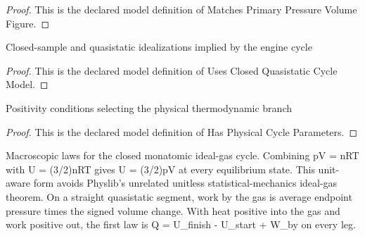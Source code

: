 \begin{proof}
  This is the declared model definition of Matches Primary Pressure Volume Figure.
\end{proof}
\begin{definition}
  \label{def:physics:phyx-mini-0433:phyxminiproblems-problemphyxmini0433-usesclosedquasistaticcyclemodel}
  Closed-sample and quasistatic idealizations implied by the engine cycle
\end{definition}
\begin{proof}
  This is the declared model definition of Uses Closed Quasistatic Cycle Model.
\end{proof}
\begin{definition}
  \label{def:physics:phyx-mini-0433:phyxminiproblems-problemphyxmini0433-hasphysicalcycleparameters}
  Positivity conditions selecting the physical thermodynamic branch
\end{definition}
\begin{proof}
  This is the declared model definition of Has Physical Cycle Parameters.
\end{proof}
\begin{definition}
  \label{def:physics:phyx-mini-0433:phyxminiproblems-problemphyxmini0433-satisfiesmonatomicidealgascyclelaws}
  Macroscopic laws for the closed monatomic ideal-gas cycle. Combining pV = nRT with U = (3/2)nRT gives U = (3/2)pV at every equilibrium state. This unit-aware form avoids Physlib's unrelated unitless statistical-mechanics ideal-gas theorem. On a straight quasistatic segment, work by the gas is average endpoint pressure times the signed volume change. With heat positive into the gas and work positive out, the first law is Q = U\_finish - U\_start + W\_by on every leg.
\end{definition}
